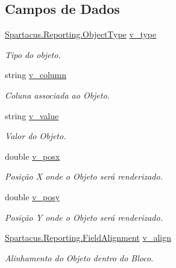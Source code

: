 \subsection*{Campos de Dados}
\begin{DoxyCompactItemize}
\item 
\hyperlink{namespaceSpartacus_1_1Reporting_a3727122f6fe78a79014ed0180e0ac2e3}{Spartacus.\+Reporting.\+Object\+Type} \hyperlink{classSpartacus_1_1Reporting_1_1Object_a8fd5f98c82c6cf6006f2a7adcae07f03}{v\+\_\+type}
\begin{DoxyCompactList}\small\item\em Tipo do objeto. \end{DoxyCompactList}\item 
string \hyperlink{classSpartacus_1_1Reporting_1_1Object_a9b82f211d6251c8ed4b12a31faed3ead}{v\+\_\+column}
\begin{DoxyCompactList}\small\item\em Coluna associada ao Objeto. \end{DoxyCompactList}\item 
string \hyperlink{classSpartacus_1_1Reporting_1_1Object_a7ecbaf47ca365f5b075bb0d7daa00276}{v\+\_\+value}
\begin{DoxyCompactList}\small\item\em Valor do Objeto. \end{DoxyCompactList}\item 
double \hyperlink{classSpartacus_1_1Reporting_1_1Object_af284bb90430db19ab86a08a21f8ec17d}{v\+\_\+posx}
\begin{DoxyCompactList}\small\item\em Posição X onde o Objeto será renderizado. \end{DoxyCompactList}\item 
double \hyperlink{classSpartacus_1_1Reporting_1_1Object_a35f330c6b1b3573d690fa0638a4808d6}{v\+\_\+posy}
\begin{DoxyCompactList}\small\item\em Posição Y onde o Objeto será renderizado. \end{DoxyCompactList}\item 
\hyperlink{namespaceSpartacus_1_1Reporting_a1b74021bf4e6e2fe6eac8a1aebddd05e}{Spartacus.\+Reporting.\+Field\+Alignment} \hyperlink{classSpartacus_1_1Reporting_1_1Object_a65977ff63394bed20f14af4a80a3b32e}{v\+\_\+align}
\begin{DoxyCompactList}\small\item\em Alinhamento do Objeto dentro do Bloco. \end{DoxyCompactList}\end{DoxyCompactItemize}


